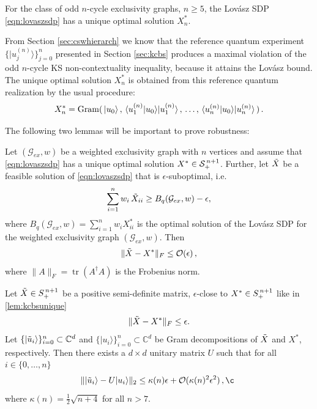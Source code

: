 \begin{lemma}
\label{lem:kcbsunique}
For the class of odd $n$-cycle exclusivity graphs, $n\geq5$, the Lovász SDP \ref{eqn:lovaszsdp} has a unique optimal solution $X^*_n$.   
\end{lemma}

From Section \ref{sec:cswhierarch} we know that the reference quantum experiment $\{\vert u_j^{(n)} \rangle \}_{j=0}^{n}$ presented in Section \ref{sec:kcbs} produces a maximal violation of the odd $n$-cycle KS non-contextuality inequality, because it attains the Lovász bound. The unique optimal solution $X^*_n$ is obtained from this reference quantum realization by the usual procedure:
\begin{equation*}
    X^*_n=\operatorname{Gram}(\thinspace\vert u_0 \rangle\thinspace,\thinspace \langle u_1^{(n)} \vert u_0 \rangle \vert u_1^{(n)} \rangle\thinspace,\thinspace\dots,\thinspace \langle u_n^{(n)} \vert u_0 \rangle \vert u_n^{(n)} \rangle\thinspace)\thinspace.
\end{equation*}

The following two lemmas will be important to prove robustness:

\begin{lemma}
\label{lem:epssuboptgram}
Let $(\mathcal{G}_{ex},w)$ be a weighted exclusivity graph with $n$ vertices and assume that \ref{eqn:lovaszsdp} has a unique optimal solution $X^*\in \mathcal{S}_+^{\thinspace n+1}$. Further, let $\Tilde{X}$ be a feasible solution of \ref{eqn:lovaszsdp} that is $\epsilon$-suboptimal, i.e.\
\begin{equation*}
    \sum_{i=1}^n w_i\thinspace\Tilde{X}_{ii} \geq B_{q}(\mathcal{G}_{ex},w)-\epsilon,
\end{equation*}
where $B_{q}(\mathcal{G}_{ex},w)=\sum_{i=1}^n w_i X_{ii}^*$ is the optimal solution of the Lovász SDP for the weighted exclusivity graph $(\mathcal{G}_{ex},w)$.
Then
\begin{equation*}
\|\Tilde{X}-X^*\|_F \leq \mathcal{O}(\epsilon)\,,
\end{equation*}
where $\|A\|_F=\operatorname{tr}(A^{\dag}A)$ is the Frobenius norm.
\end{lemma}

\begin{lemma}
\label{lem:closegramdecomp}
Let $\Tilde{X}\in S_{+}^{\thinspace n+1}$ be a positive semi-definite matrix, $\epsilon$-close to $X^*\in S_{+}^{\thinspace n+1}$ like in \ref{lem:kcbsunique}
\begin{equation*}
\|\Tilde{X}-X^*\|_F \leq \epsilon.
\end{equation*}
Let $\{\vert \Tilde{u}_i \rangle\}_{i=0}^n\subset\mathbb{C}^{d}$ and $\{\vert u_i\rangle\}_{i=0}^n\subset\mathbb{C}^{d}$ be Gram decompositions of $\Tilde{X}$ and $X^*$, respectively. Then there exists a $d\times d$ unitary matrix $U$ such that for all $i\in\{0,\dots,n\}$
\begin{equation*}
    \|\vert \Tilde{u}_i\rangle - U \vert u_i\rangle\|_2 \leq \kappa(n)\epsilon + \mathcal{O}(\kappa(n)^2\epsilon^2)\,,¸
\end{equation*}
where $\kappa(n)=\frac{1}{2}\sqrt{n+4}$ for all $n>7$.
\end{lemma}

